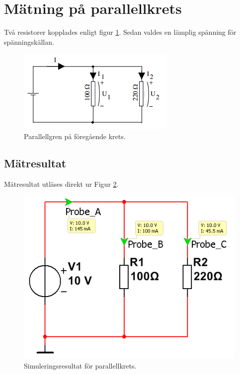\documentclass[11pt,a4paper]{article}
\begin{document}
\clearpage

\section{Mätning på parallellkrets}\label{}
Två resistorer kopplades enligt figur \ref{fig:3-mm-schem}.
Sedan valdes en lämplig spänning för spänningskällan.

\begin{figure}[htbp]
    \centering
        \includegraphics[scale=1]{misc/krets3.png}
    \caption{Parallellgren på föregående krets.}
    \label{fig:3-mm-schem}
\end{figure}

\subsection{Mätresultat}\label{}
Mätresultat utläses direkt ur Figur \ref{fig:sim3}.

\begin{figure}[htbp]
    \centering
    \includegraphics[scale=0.5]{ee466multisim/3.png}
    \caption{Simuleringsresultat för parallellkrets.}
    \label{fig:sim3}
\end{figure}
\end{document}
